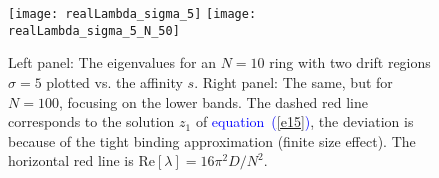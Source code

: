 \documentclass[aps,pre,floats,floatfix,fleqn,notitlepage]{revtex4-1}
\newcommand{\eexp}{\mbox{e}^}
\newcommand{\mylabel}[1]{\label{#1}}  %
\newcommand{\beq}{\begin{eqnarray}}
\newcommand{\eeq}{\end{eqnarray}}
\newcommand{\be}[1]{\begin{eqnarray}\ifthenelse{#1=-1}{\nonumber}{\ifthenelse{#1=0}{}{\mylabel{e#1}}}}
\newcommand{\ee}{\end{eqnarray}}
\newcommand{\Eq}[1]{\textcolor{blue}{equation~(\ref{#1})}} %
\begin{document}
\begin{figure}
\texttt{[image: realLambda\_sigma\_5]}
\texttt{[image: realLambda\_sigma\_5\_N\_50]}
\caption{Left panel: The eigenvalues for an $N=10$ ring with two drift regions $\sigma=5$ plotted vs. the affinity $s$. Right panel: The same, but for $N=100$, focusing on the lower bands. The dashed red line corresponds to the solution $z_1$ of \Eq{e15}, the deviation is because of the tight binding approximation (finite size effect). The horizontal red line is $\text{Re}[\lambda] = 16\pi^2D/N^2$.}
\label{realSpectrum}
\end{figure}



\clearpage
\clearpage
%
\end{document}
